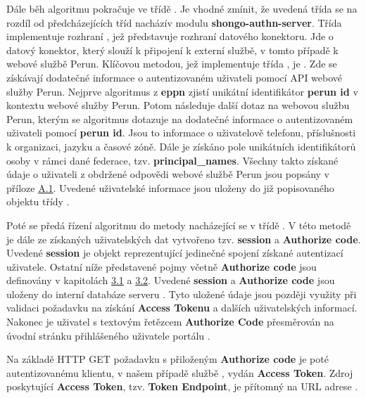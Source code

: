 \documentclass[
  printed, %
  twoside, %
  table,   %
  nolof,     %
  nolot,     %
]{fithesis3}
\begin{document}
\label{sec:responseAction}
Dále běh algoritmu pokračuje ve třídě . Je vhodné zmínit, že uvedená třída  se na rozdíl od předcházejících tříd nachází\break v modulu \textbf{shongo-authn-server}. Třída  implementuje rozhraní , jež představuje rozhraní datového konektoru. Jde o datový konektor, který slouží k připojení k externí službě, v tomto případě k webové službě Perun. Klíčovou metodou, jež implementuje třída , je . Zde se získávají dodatečné informace o autentizovaném uživateli pomocí API webové služby Perun. Nejprve algoritmus z \textbf{eppn} zjistí unikátní identifikátor \textbf{perun id} v kontextu webové služby Perun. Potom následuje další dotaz na webovou službu Perun, kterým se algoritmus dotazuje na dodatečné informace o autentizovaném uživateli pomocí \textbf{perun id}. Jsou to informace o uživatelově telefonu, příslušnosti k organizaci, jazyku a časové zóně. Dále je získáno pole unikátních identifikátorů osoby v rámci dané federace, tzv. \textbf{principal\_names}. Všechny takto získané údaje o uživateli z obdržené odpovědi webové službě Perun jsou popsány v příloze \hyperref[table:perunws:user]{A.1}. Uvedené uživatelské informace jsou uloženy do již popisovaného objektu třídy . \par

Poté se předá řízení algoritmu do metody  nacházející se v třídě . V této metodě je dále ze získaných uživatelských dat vytvořeno tzv. \textbf{session} a \textbf{Authorize code}. Uvedené \textbf{session} je objekt reprezentující jedinečné spojení získané autentizací uživatele. Ostatní níže představené pojmy včetně \textbf{Authorize code} jsou definovány v kapitolách \hyperref[sec:oauth]{3.1} a \hyperref[sec:oidc]{3.2}. Uvedené \textbf{session} a \textbf{Authorize code} jsou uloženy do interní databáze serveru . Tyto uložené údaje jsou později využity při validaci požadavku na získání \textbf{Access Tokenu} a dalších uživatelských informací. Nakonec je uživatel s textovým řetězcem \textbf{Authorize Code} přesměrován na úvodní stránku přihlášeného uživatele portálu . \par

Na základě HTTP GET požadavku s přiloženým \textbf{Authorize code} je poté autentizovanému klientu, v našem případě službě , vydán  \textbf{Access Token}. Zdroj poskytující \textbf{Access Token}, tzv. \textbf{Token Endpoint}, je přítomný na URL adrese . \par 
\end{document}
